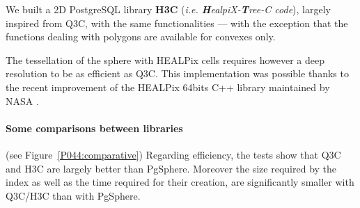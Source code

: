 We built a 2D PostgreSQL library \textbf{H3C} (\textit{i.e. \textbf{H}ealpiX-\textbf{T}ree-C code}), largely inspired from  Q3C, with the same functionalities --- with the exception that the functions dealing with polygons are available for convexes only.

The tessellation of the sphere with HEALPix cells requires however a deep resolution to be as efficient as Q3C. This implementation was possible thanks to the recent improvement of the  HEALPix 64bits C++ library maintained by NASA \citep{gorski_healpix}.

\paragraph{Some comparisons between libraries} (see Figure~\ref{P044:comparative}) Regarding  efficiency, the tests show that Q3C and H3C are largely better than PgSphere. Moreover the size required by the index as well as the time required for their creation, are significantly smaller with Q3C/H3C than with PgSphere.

